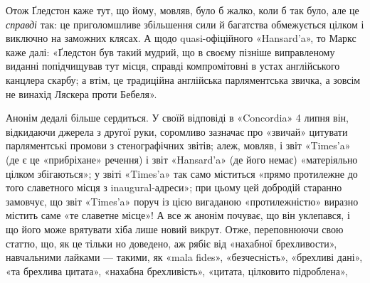 Отож Ґледстон каже тут, що йому, мовляв, було б жалко,
коли б так було, але це \emph{справді} так: це приголомшливе збільшення
сили й багатства обмежується цілком і виключно на заможних
клясах. А щодо quasi-офіційного «Hansard’a», то Маркс каже
далі: «Ґледстон був такий мудрий, що в своєму пізніше виправленому
виданні попідчищував тут місця, справді компромітовні
в устах англійського канцлера скарбу; а втім, це традиційна
англійська парляментська звичка, а зовсім не винахід Ляскера
проти Бебеля».

Анонім дедалі більше сердиться. У своїй відповіді в «Concordia»
4 липня він, відкидаючи джерела з другої руки, соромливо
зазначає про «звичай» цитувати парляментські промови з стенографічних
звітів; алеж, мовляв, і звіт «Times’a» (де є це «прибріхане»
речення) і звіт «Hansard’a» (де його немає) «матеріяльно
цілком збігаються»; у звіті «Times’a» так само міститься «прямо
протилежне до того славетного місця з inaugural-адреси»; при
цьому цей добродій старанно замовчує, що звіт «Times’a» поруч
із цією вигаданою «протилежністю» виразно містить саме «те
славетне місце»! А все ж анонім почуває, що він уклепався, і що
його може врятувати хіба лише новий викрут. Отже, переповнюючи
свою статтю, що, як це тільки но доведено, аж рябіє від
«нахабної брехливости», навчальними лайками — такими, як
«mala fides», «безчесність», «брехливі дані», «та брехлива цитата»,
«нахабна брехливість», «цитата, цілковито підроблена»,
\parbreak{}  %
